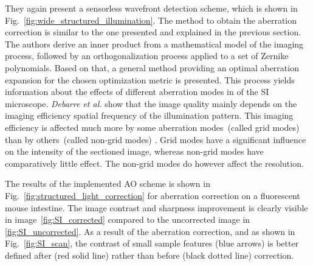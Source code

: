 They again present a sensorless wavefront detection scheme, which is shown in Fig.~\ref{fig:wide_structured_illumination}. The method to obtain the aberration correction is similar to the one presented and explained in the previous section. 
The authors derive an inner product from a mathematical model of the imaging process, followed by an orthogonalization process applied to a set of Zernike polynomials. Based on that, a general method providing an optimal aberration expansion for the chosen optimization metric is presented. This process yields  information about the effects of different aberration modes in of the SI microscope. \emph{Debarre et al.} show that the image quality mainly depends on the imaging efficiency spatial frequency of the illumination pattern. This imaging efficiency is affected much more by some aberration modes~(called grid modes) than by others~(called non-grid modes) . Grid modes have a significant influence on the intensity of the sectioned image, whereas non-grid modes have comparatively little effect. The non-grid modes do however affect the resolution. 

The results of the implemented AO scheme is shown in Fig.~\ref{fig:structured_light_correction} for aberration correction on a fluorescent mouse intestine. The image contrast and sharpness improvement is clearly visible in image~\ref{fig:SI_corrected} compared to the uncorrected image in \ref{fig:SI_uncorrected}. As a result of the aberration correction, and as shown in Fig.~\ref{fig:SI_scan}, the contrast of small sample features (blue arrows) is better defined after (red solid line) rather than before (black dotted line) correction. 

